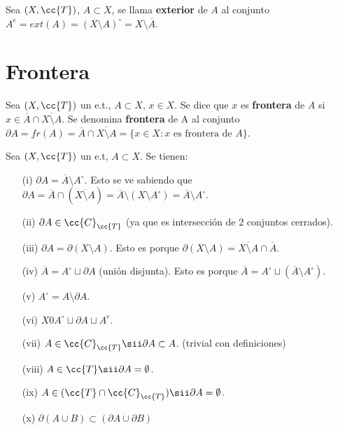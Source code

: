 \begin{definicion}
    Sea $(X, \cc{T})$, $A\subset X$, se llama \textbf{exterior} de $A$ al conjunto $A^e = ext(A) = (X\setminus A)^\circ = X \setminus \overline{A}$.
    \endsquare
\end{definicion}

\section{Frontera}

\begin{definicion}
    Sea $(X, \cc{T})$ un e.t., $A\subset X$, $x\in X$. Se dice que $x$ es \textbf{frontera} de $A$ si $x\in \overline{A}\cap \overline{X\setminus A}$. Se denomina \textbf{frontera} de A al conjunto $\partial A = fr(A) =\overline{A}\cap \overline{X\setminus A} = \{x\in X : x\text{ es frontera de }A\}$.
    \endsquare
\end{definicion}

\begin{prop}
    Sea $(X, \cc{T})$ un e.t, $A\subset X$. Se tienen:
    \begin{enumerate}
        \item[(i)] $\partial A = \overline{A}\setminus A^\circ$. Esto se ve sabiendo que $\partial A = \overline{A}\cap (\overline{X\setminus A}) = \overline{A}\setminus (X\setminus A^\circ) = \overline{A}\setminus A^\circ$.
        \item[(ii)] $\partial A \in \cc{C}_{\cc{T}}$ (ya que es intersección de 2 conjuntos cerrados).
        \item[(iii)] $\partial A = \partial (X\setminus A)$. Esto es porque $\partial (X\setminus A) = \overline{X\setminus A}\cap \overline{A}$.
        \item[(iv)] $\overline{A} = A^\circ \sqcup \partial A$ (unión disjunta). Esto es porque $\overline{A} = A^\circ\sqcup (\overline{A}\setminus A^\circ)$.
        \item[(v)] $A^\circ = A \setminus \partial A$.
        \item[(vi)] $X 0 A^\circ\sqcup \partial A \sqcup A^e$.
        \item[(vii)] $A \in \cc{C}_{\cc{T}} \sii \partial A \subset A$. (trivial con definiciones) %
        \item[(viii)] $A \in \cc{T} \sii \partial A = \emptyset$.
        \item[(ix)] $A\in (\cc{T}\cap \cc{C}_{\cc{T}}) \sii \partial A = \emptyset$.
        \item[(x)] $\partial (A\cup B) \subset (\partial A \cup \partial B)$
    \end{enumerate}
    \endsquare
\end{prop}

